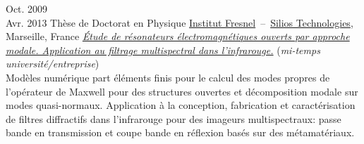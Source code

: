 \documentclass{cv}
\begin{document}
\begin{entrylist}
	\entry
	{Oct. 2009\\Avr. 2013}
	{Thèse de Doctorat en Physique}
	{\href{http://www.fresnel.fr/}{Institut Fresnel}~--~\href{http://www.silios.com/}{Silios Technologies}, Marseille, France}
	{\emph{\href{http://tel.archives-ouvertes.fr/index.php?halsid=slas337fv1oqlj1okgkq7q42i5&view_this_doc=tel-00918651&version=1}
			{\'Etude de résonateurs électromagnétiques ouverts par approche modale.
				Application au filtrage multispectral dans l'infrarouge.}} (\emph{mi-temps université/entreprise})\\
		Modèles numérique part éléments finis pour le calcul des modes propres de
		l'opérateur de Maxwell pour des structures ouvertes et décomposition modale sur modes quasi-normaux.
		Application à la conception, fabrication et caractérisation de
		filtres diffractifs dans l'infrarouge pour des imageurs multispectraux: passe bande en
		transmission et coupe bande en réflexion basés sur des métamatériaux.
	}

\end{entrylist}





\end{document}
